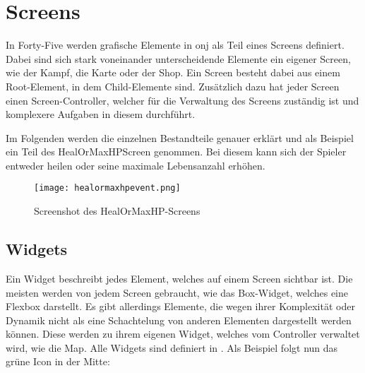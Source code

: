 \renewcommand{\kapitelautor}{Autor: Felix Zwickelstorfer}
\section{Screens}\label{sec:screens}

\renewcommand{\kapitelautor}{Autor: Felix Zwickelstorfer}

In Forty-Five werden grafische Elemente in onj als Teil eines Screens definiert.
Dabei sind sich stark voneinander unterscheidende Elemente ein eigener Screen, wie \zB der Kampf, die Karte oder der Shop.
Ein Screen besteht dabei aus einem Root-Element, in dem Child-Elemente sind.
Zusätzlich dazu hat jeder Screen einen Screen-Controller, welcher für die Verwaltung des Screens zuständig ist und komplexere Aufgaben in diesem durchführt.

Im Folgenden werden die einzelnen Bestandteile genauer erklärt und als Beispiel ein Teil des HealOrMaxHPScreen genommen.
Bei diesem kann sich der Spieler entweder heilen oder seine maximale Lebensanzahl erhöhen.
\begin{figure}[H]
    \centering
    \texttt{[image: healormaxhpevent.png]}
    \caption{Screenshot des HealOrMaxHP-Screens}
\end{figure}

\subsection{Widgets}\label{sec:widgets}
Ein Widget beschreibt jedes Element, welches auf einem Screen sichtbar ist.
Die meisten werden von jedem Screen gebraucht, wie \zB das Box-Widget, welches eine Flexbox darstellt.
Es gibt allerdings Elemente, die wegen ihrer Komplexität oder Dynamik nicht als eine Schachtelung von anderen Elementen dargestellt werden können.
Diese werden zu ihrem eigenen Widget, welches vom Controller verwaltet wird, wie \zB die Map.
Alle Widgets sind definiert in .
Als Beispiel folgt nun das grüne Icon in der Mitte:







